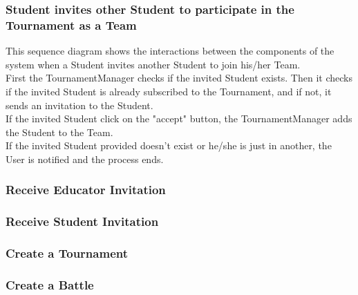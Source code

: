 \subsubsection{Student invites other Student to participate in the Tournament as a Team}
This sequence diagram shows the interactions between the components of the system when a Student invites another Student to join his/her Team.\\
First the TournamentManager checks if the invited Student exists. Then it checks if the invited Student is already subscribed to the Tournament, and if not, it sends an invitation to the Student.\\
If the invited Student click on the "accept" button, the TournamentManager adds the Student to the Team.\\
If the invited Student provided doesn't exist or he/she is just in another, the User is notified and the process ends.\\

\clearpage
\subsubsection{Receive Educator Invitation}

\clearpage
\subsubsection{Receive Student Invitation}

\clearpage
\subsubsection{Create a Tournament}

\clearpage
\subsubsection{Create a Battle}

